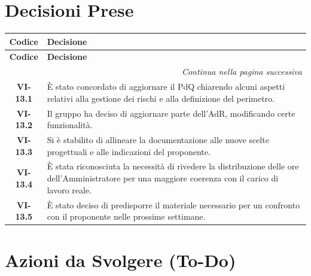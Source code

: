 \section{Decisioni Prese}

\renewcommand{\arraystretch}{1.3}
\vspace{-0.3cm}
\noindent
\begin{longtable}{c p{12cm}}
	\toprule
	\textbf{Codice} & \textbf{Decisione} \\
	\midrule
	\endfirsthead

	\toprule
	\textbf{Codice} & \textbf{Decisione} \\
	\midrule
	\endhead

	\midrule
	\multicolumn{2}{r}{\textit{Continua nella pagina successiva}} \\
	\midrule
	\endfoot

	\bottomrule
	\endlastfoot

	
    \textbf{VI-13.1} & È stato concordato di aggiornare il PdQ chiarendo alcuni aspetti relativi alla gestione dei rischi e alla definizione del perimetro. \\[4pt]

    \textbf{VI-13.2} & Il gruppo ha deciso di aggiornare parte dell’AdR, modificando certe funzionalità. \\[4pt]

    \textbf{VI-13.3} & Si è stabilito di allineare la documentazione alle nuove scelte progettuali e alle indicazioni del proponente. \\[4pt]

    \textbf{VI-13.4} & È stata riconosciuta la necessità di rivedere la distribuzione delle ore dell’Amministratore per una maggiore coerenza con il carico di lavoro reale. \\[4pt]

    \textbf{VI-13.5} & È stato deciso di predisporre il materiale necessario per un confronto con il proponente nelle prossime settimane. \\[4pt]

\end{longtable}

\section{Azioni da Svolgere (To-Do)}

